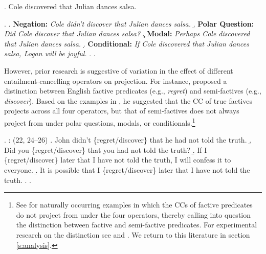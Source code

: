 \documentclass[a4paper,12pt,twoside]{article}
\begin{document}

    
    \ex.\label{ex:simple} Cole discovered that Julian dances salsa.

	\ex. \label{ex:family}
		\a. \label{ex:neg}
			{\bf Negation:} \hfill
			\emph{Cole didn't discover that Julian dances salsa.}
		\b. \label{ex:q}
			{\bf Polar Question:} \hfill
			\emph{Did Cole discover that Julian dances salsa?}
		\c. \label{ex:mod}
			{\bf Modal:} \hfill
			\emph{Perhaps Cole discovered that Julian dances salsa.}
		\d. \label{ex:cond}
			{\bf Conditional:} \hfill
			\emph{If Cole discovered that Julian dances salsa, Logan will be joyful.}
		\z.
	\z.

    However, prior research is suggestive of variation in the effect of different entailment-cancelling operators on projection. For instance, \citet{karttunen_observations_1971} proposed a distinction between English factive predicates (e.g., \textit{regret}) and semi-factives (e.g., \textit{discover}).
    Based on the examples in \Next, he suggested that the CC of true factives projects across all four operators, but that of semi-factives does not always project from under polar questions, modals, or conditionals.\footnote{See \citealt{beaver_have_2010} for naturally occurring examples in which the CCs of factive predicates do not project from under the four operators, thereby calling into question the distinction between factive and semi-factive predicates. For experimental research on the distinction see \citealt{djaerv-etal2016} and \citealt{djarv_cognitive_2018}. We return to this literature in section \ref{s:analysis}.}

    \ex. \citealt{karttunen_observations_1971}: (22, 24--26)
        \a. John didn't \{regret/discover\} that he had not told the truth.
        \b. Did you \{regret/discover\} that you had not told the truth?
        \b. If I \{regret/discover\} later that I have not told the truth, I will confess it to everyone.
        \b. It is possible that I \{regret/discover\} later that I have not told the truth.
        \z.
    \z.
\end{document}
